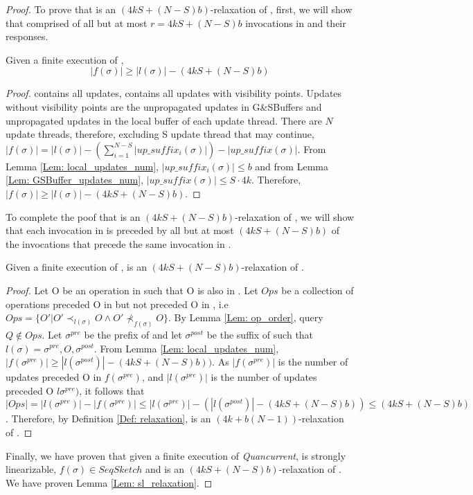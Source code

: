 \begin{proof}
To prove that \fs is an \((4kS + (N-S)b)\)-relaxation of \ls, first, we will show that \fs comprised of all but at most \(r=4kS + (N-S)b\) invocations in \ls and their responses.

\begin{lemma} \label{Lem: invocations_bound}
Given a finite execution \s of \mysketch, \[ |f(\sigma)| \ge |l(\sigma)| - (4kS + (N-S)b) \]
\end{lemma}
\begin{proof}
\ls contains all updates, \fs contains all updates with visibility points. Updates without visibility points are the unpropagated updates in G\&SBuffers and unpropagated updates in the local buffer of each update thread. There are \(N\) update threads, therefore, excluding S update thread that may continue, \(|f(\sigma)| = |l(\sigma)| - (\sum_{i=1}^{N-S}|up\_suffix_i(\sigma)|) - |up\_suffix(\sigma)|\). From Lemma \ref{Lem: local_updates_num}, \(|up\_suffix_i(\sigma)| \leq b\) and from Lemma \ref{Lem: GSBuffer_updates_num}, \(|up\_suffix(\sigma)| \leq S \cdot 4k\). Therefore, \(|f(\sigma)| \ge |l(\sigma)| - (4kS + (N-S)b)\).
\end{proof}

To complete the poof that \fs is an \((4kS + (N-S)b)\)-relaxation of \ls, we will show that each invocation in \fs is preceded by all but at most \((4kS + (N-S)b)\) of the invocations that precede the same invocation in \ls.

\begin{lemma}\label{Lem: relaxation}
Given a finite execution \s of \mysketch, \fs is an \((4kS + (N-S)b)\)-relaxation of \ls.
\end{lemma}
\begin{proof}
Let O be an operation in \fs such that O is also in \ls. Let \(Ops\) be a collection of operations preceded O in \ls but not preceded O in \fs, i.e \( Ops=\{O'| O' \prec_{l(\sigma)} O \wedge  O' \nprec_{f(\sigma)} O \} \). By Lemma \ref{Lem: op_order}, query \( Q \notin Ops \). Let \(\sigma^{pre}\) be the prefix of \s and let \(\sigma^{post}\) be the suffix of \s such that \( l(\sigma)=\sigma^{pre},O,\sigma^{post} \). From Lemma \ref{Lem: local_updates_num}, \(|f(\sigma^{pre})| \ge |l(\sigma^{post})| - (4kS + (N-S)b))\). As \(|f(\sigma^{pre})|\) is the number of updates preceded O in \(f(\sigma^{pre})\), and \(|l(\sigma^{pre})|\) is the number of updates preceded O \(l\sigma^{pre})\), it follows that \(|Ops| = |l(\sigma^{pre})|-|f(\sigma^{pre})| \leq |l(\sigma^{pre})|-(|l(\sigma^{post})| - (4kS + (N-S)b))\leq (4kS + (N-S)b)\). Therefore, by Definition \ref{Def: relaxation}, \fs is an \((4k+b(N-1))\)-relaxation of \ls.
\end{proof}

Finally, we have proven that given a finite execution \s of \emph{Quancurrent}, \ls is strongly linearizable, \(f(\sigma) \in SeqSketch\) and \fs is an \((4kS + (N-S)b)\)-relaxation of \ls. We have proven Lemma \ref{Lem: sl_relaxation}.

\end{proof}
